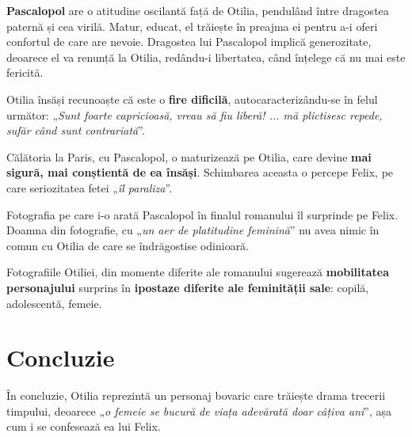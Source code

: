 \documentclass{article}
\newcommand{\qu}[1]{„\emph{#1}”}
\begin{document}
\textbf{Pascalopol} are o atitudine oscilantă față de Otilia, pendulând între dragostea paternă și cea virilă. Matur, educat, el trăiește în preajma ei pentru a-i oferi confortul de care are nevoie. Dragostea lui Pascalopol implică generozitate, deoarece el va renunță la Otilia, redându-i libertatea, când înțelege că nu mai este fericită.

Otilia însăși recunoaște că este o \textbf{fire dificilă}, autocaracterizându-se în felul următor: \qu{Sunt foarte capricioasă, vreau să fiu liberă! ... mă plictisesc repede, sufăr când sunt contrariată}.

Călătoria la Paris, cu Pascalopol, o maturizează pe Otilia, care devine \textbf{mai sigură, mai conștientă de ea însăși}. Schimbarea aceasta o percepe Felix, pe care seriozitatea fetei \qu{îl paraliza}.

Fotografia pe care i-o arată Pascalopol în finalul romanului îl surprinde pe Felix. Doamna din fotografie, cu \qu{un aer de platitudine feminină} nu avea nimic în comun cu Otilia de care se îndrăgostise odinioară.

Fotografiile Otiliei, din momente diferite ale romanului sugerează \textbf{mobilitatea personajului} surprins în \textbf{ipostaze diferite ale feminității sale}: copilă, adolescentă, femeie.
\section{Concluzie}
În concluzie, Otilia reprezintă un personaj bovaric care trăiește drama trecerii timpului, deoarece \qu{o femeie se bucură de viața adevărată doar câțiva ani}, așa cum i se confesează ea lui Felix.
\end{document}
